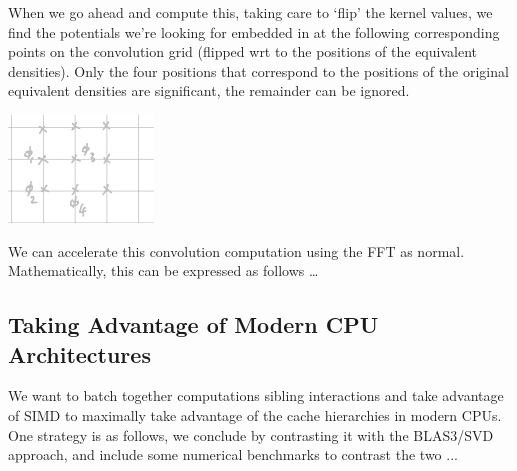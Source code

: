 \documentclass[12pt, a4, twoside]{article}
\begin{document}
When we go ahead and compute this, taking care to `flip' the kernel values, we find the potentials we're looking for embedded in at the following corresponding points on the convolution grid (flipped wrt to the positions of the equivalent densities). Only the four positions that correspond to the positions of the original equivalent densities are significant, the remainder can be ignored.


\begin{center}    
    \includegraphics{result.jpg}
\end{center}


We can accelerate this convolution computation using the FFT as normal. Mathematically, this can be expressed as follows \dots

\subsection{Taking Advantage of Modern CPU Architectures}

We want to batch together computations sibling interactions and take advantage of SIMD to maximally take advantage of the cache hierarchies in modern CPUs. One strategy is as follows, we conclude by contrasting it with the BLAS3/SVD approach, and include some numerical benchmarks to contrast the two ...


    
\printbibliography[heading=bibintoc]
\end{document}
